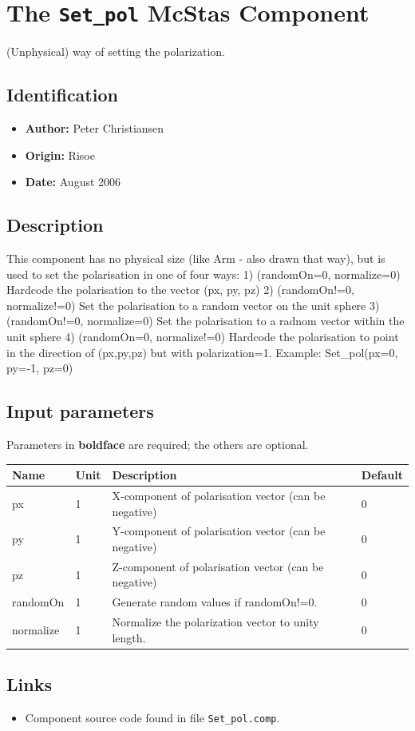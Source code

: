 \section{The \texttt{Set\_pol} McStas Component}
(Unphysical) way of setting the polarization.

\subsection*{Identification}
\begin{itemize}
  \item \textbf{Author:} Peter Christiansen
  \item \textbf{Origin:} Risoe
  \item \textbf{Date:} August 2006
\end{itemize}

\subsection*{Description}
This component has no physical size (like Arm - also drawn that way), but is used to set the polarisation in one of four ways: 1) (randomOn=0, normalize=0) Hardcode the polarisation to the vector (px, py, pz) 2) (randomOn!=0, normalize!=0) Set the polarisation to a random vector on the unit sphere 3) (randomOn!=0, normalize=0) Set the polarisation to a radnom vector within the unit sphere 4) (randomOn=0, normalize!=0) Hardcode the polarisation to point in the direction of (px,py,pz) but with polarization=1. Example: Set\_pol(px=0, py=-1, pz=0)

\subsection*{Input parameters}
Parameters in \textbf{boldface} are required; the others are optional.

\begin{longtable}{p{}p{}p{}p{}}
\toprule
\textbf{Name} & \textbf{Unit} & \textbf{Description} & \textbf{Default} \\
\midrule
\endhead
px & 1 & X-component of polarisation vector (can be negative) & 0 \\
py & 1 & Y-component of polarisation vector (can be negative) & 0 \\
pz & 1 & Z-component of polarisation vector (can be negative) & 0 \\
randomOn & 1 & Generate random values if randomOn!=0. & 0 \\
normalize & 1 & Normalize the polarization vector to unity length. & 0 \\
\bottomrule
\end{longtable}

\subsection*{Links}
\begin{itemize}
  \item Component source code found in file \texttt{Set\_pol.comp}.
\end{itemize}
